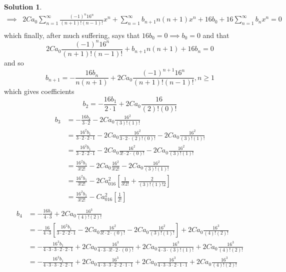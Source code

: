 \documentclass[10pt]{article}
\theoremstyle{definition}
\newtheorem{soln}{Solution}
\begin{document}
\begin{soln}
\begin{align*}
    \implies &
    2Ca_0\sum_{n=1}^{\infty}\frac{(-1)^n16^n}{(n+1)!(n-1)!}x^{n}
    +\sum_{n=1}^{\infty}b_{n+1}n(n+1)x^{n}
    +16b_0+16\sum_{n=1}^{\infty}b_nx^{n} =0                                                                     \\
  \end{align*}
  which finally, after much suffering, says that $16b_0=0\implies b_0=0$ and that
  $$2Ca_0\frac{(-1)^n16^n}{(n+1)!(n-1)!}+b_{n+1}n(n+1)+16b_n=0$$
  and so
  $$b_{n+1}=-\frac{16b_n}{n(n+1)}+2Ca_0\frac{(-1)^{n+1}16^n}{(n+1)!(n-1)!},n\geq 1$$
  which gives coefficients
  $$b_{2}=-\frac{16b_1}{2\cdot 1}+2Ca_0\frac{16}{(2)!(0)!}$$
  \begin{align*}
    b_{3} & =-\frac{16b_2}{3\cdot 2}-2Ca_0\frac{16^2}{(3)!(1)!}                                                       \\
          & =\frac{16^2b_1}{3\cdot 2\cdot2\cdot 1}-2Ca_0\frac{16^2}{3\cdot 2\cdot(2)!(0)!}-2Ca_0\frac{16^2}{(3)!(1)!} \\
          & =\frac{16^2b_1}{3\cdot 2\cdot2\cdot 1}-2Ca_0\frac{16^2}{3!\cdot 2\cdot (0)!}-2Ca_0\frac{16^2}{(3)!(1)!}   \\
          & =\frac{16^2b_1}{3!2!}-2Ca_0\frac{16^2}{3!2!}-2Ca_0\frac{16^2}{(3)!(1)!}                                   \\
          & =\frac{16^2b_1}{3!2!}-2Ca_016^2\left[\frac{1}{3!2!}+\frac{2}{(3)!(1)!2}\right]                            \\
          & =\frac{16^2b_1}{3!2!}-Ca_016^2\left[\frac{1}{2!}\right]                                                   \\
  \end{align*}
  \begin{align*}
    b_{4} & =-\frac{16b_3}{4\cdot 3}+2Ca_0\frac{16^3}{(4)!(2)!}                                                                                                                                            \\
          & =-\frac{16}{4\cdot 3}\left[\frac{16^2b_1}{3\cdot 2\cdot2\cdot 1}-2Ca_0\frac{16^2}{3!\cdot 2\cdot (0)!}-2Ca_0\frac{16^2}{(3)!(1)!}\right]+2Ca_0\frac{16^3}{(4)!(2)!}                            \\
          & =-\frac{16^3b_1}{4\cdot 3\cdot3\cdot 2\cdot2\cdot 1}+2Ca_0\frac{16^3}{4\cdot 3\cdot3!\cdot 2\cdot (0)!}+2Ca_0\frac{16^3}{4\cdot 3\cdot(3)!(1)!}+2Ca_0\frac{16^3}{(4)!(2)!}                     \\
          & =-\frac{16^3b_1}{4\cdot 3\cdot3\cdot 2\cdot2\cdot 1}+2Ca_0\frac{16^3}{4\cdot 3\cdot3\cdot2\cdot 2\cdot 1\cdot 1}+2Ca_0\frac{16^3}{4\cdot 3\cdot3\cdot2\cdot1\cdot1}+2Ca_0\frac{16^3}{(4)!(2)!} \\

\end{align*}
\end{soln}
\end{document}

